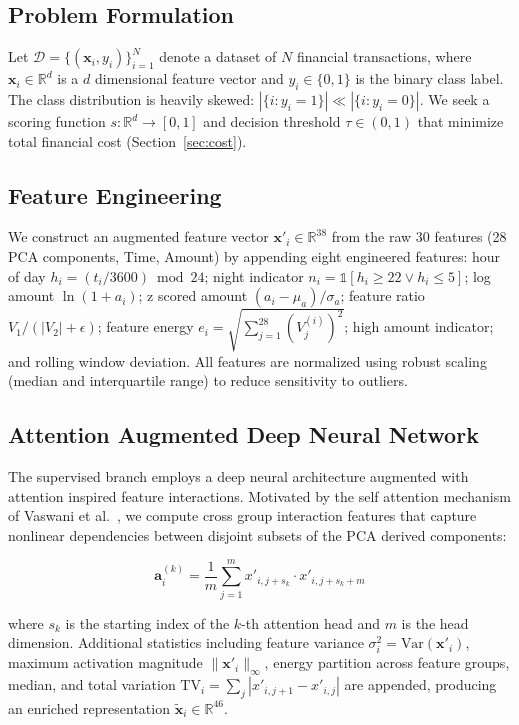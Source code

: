 \documentclass[conference]{IEEEtran}
\begin{document}
\subsection{Problem Formulation}

Let $\mathcal{D} = \{(\mathbf{x}_i, y_i)\}_{i=1}^{N}$ denote a dataset of $N$ financial transactions, where $\mathbf{x}_i \in \mathbb{R}^d$ is a $d$ dimensional feature vector and $y_i \in \{0, 1\}$ is the binary class label. The class distribution is heavily skewed: $|\{i : y_i = 1\}| \ll |\{i : y_i = 0\}|$. We seek a scoring function $s: \mathbb{R}^d \to [0, 1]$ and decision threshold $\tau \in (0, 1)$ that minimize total financial cost (Section~\ref{sec:cost}).

\subsection{Feature Engineering}

We construct an augmented feature vector $\mathbf{x}'_i \in \mathbb{R}^{38}$ from the raw 30 features (28 PCA components, Time, Amount) by appending eight engineered features: hour of day $h_i = (t_i / 3600) \bmod 24$; night indicator $n_i = \mathbb{1}[h_i \geq 22 \lor h_i \leq 5]$; log amount $\ln(1 + a_i)$; z scored amount $(a_i - \mu_a)/\sigma_a$; feature ratio $V_1 / (|V_2| + \epsilon)$; feature energy $e_i = \sqrt{\sum_{j=1}^{28} (V_j^{(i)})^2}$; high amount indicator; and rolling window deviation. All features are normalized using robust scaling (median and interquartile range) to reduce sensitivity to outliers.

\subsection{Attention Augmented Deep Neural Network}
\label{sec:aadnn}

The supervised branch employs a deep neural architecture augmented with attention inspired feature interactions. Motivated by the self attention mechanism of Vaswani et al.~\cite{vaswani2017attention}, we compute cross group interaction features that capture nonlinear dependencies between disjoint subsets of the PCA derived components:

\begin{equation}
\mathbf{a}_i^{(k)} = \frac{1}{m} \sum_{j=1}^{m} x'_{i,j+s_k} \cdot x'_{i,j+s_k+m}
\label{eq:cross_attn}
\end{equation}

\noindent where $s_k$ is the starting index of the $k$-th attention head and $m$ is the head dimension. Additional statistics including feature variance $\sigma_i^2 = \text{Var}(\mathbf{x}'_i)$, maximum activation magnitude $\|\mathbf{x}'_i\|_\infty$, energy partition across feature groups, median, and total variation $\text{TV}_i = \sum_{j} |x'_{i,j+1} - x'_{i,j}|$ are appended, producing an enriched representation $\tilde{\mathbf{x}}_i \in \mathbb{R}^{46}$.
\end{document}
